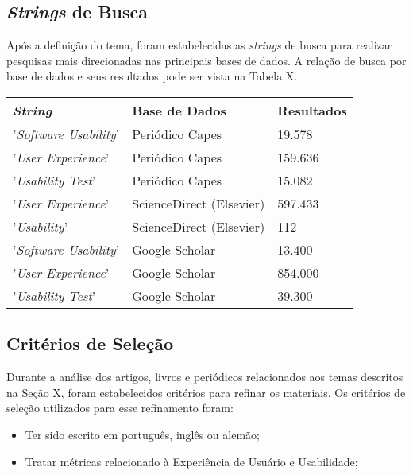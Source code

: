 \subsection{\textit{Strings} de Busca}
\label{sec:Strings de Busca}
Após a definição do tema, foram estabelecidas as \textit{strings} de busca para realizar pesquisas mais direcionadas nas principais bases de dados. A relação de busca por base de dados e seus resultados pode ser vista na Tabela X.

\begin{table}[h]
	\centering
	\begin{tabular}{|l|l|l|}
	\hline
	\textit{String}               & Base de Dados            & Resultados \\ \hline
	'\textit{Software Usability}' & Periódico Capes          & 19.578     \\ \hline
	'\textit{User Experience}'    & Periódico Capes          & 159.636    \\ \hline
	'\textit{Usability Test}'     & Periódico Capes          & 15.082     \\ \hline
	'\textit{User Experience}'    & ScienceDirect (Elsevier) & 597.433    \\ \hline
	'\textit{Usability}'          & ScienceDirect (Elsevier) & 112        \\ \hline
	'\textit{Software Usability}' & Google Scholar           & 13.400     \\ \hline
	'\textit{User Experience}'    & Google Scholar           & 854.000    \\ \hline
	'\textit{Usability Test}'     & Google Scholar           & 39.300     \\ \hline
	\end{tabular}
\end{table}

\subsection{Critérios de Seleção}
\label{sec:Critérios de Selecao}
Durante a análise dos artigos, livros e periódicos relacionados aos temas descritos na Seção X, foram estabelecidos critérios para refinar os materiais. Os critérios de seleção utilizados para esse refinamento foram:

\begin{itemize}
	\item Ter sido escrito em português, inglês ou alemão;
	\item Tratar métricas relacionado à Experiência de Usuário e Usabilidade;
\end{itemize}

